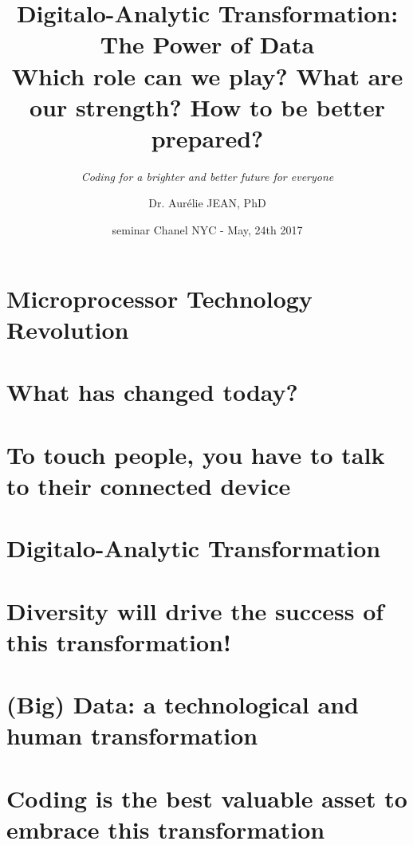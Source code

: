 \documentclass{beamer}
\title{Digitalo-Analytic Transformation:\\The Power of Data \\Which role can we play? What are our strength? How to be better prepared?}
\subtitle{\textcolor{isvblue}{\textit{Coding for a brighter and better future for everyone}}}
\author{Dr. Aur\'elie JEAN, PhD}
\institute{\textcolor{isvblue}{In Silico Veritas, LLC} - aurelie@silicoveritas.com}
\date{seminar Chanel NYC - May, 24th 2017}
\begin{document}
	\setcounter{showProgressBar}{0}
	\setcounter{showSlideNumbers}{0}

        \begin{frame}%
        \maketitle
        \end{frame}


	\setcounter{framenumber}{0}
	\setcounter{showProgressBar}{1}
	\setcounter{showSlideNumbers}{1}

        
        \section{Microprocessor Technology Revolution}
        

        \section{What has changed today?}
        

        \section{To touch people, you have to talk to their connected device}


        \section{Digitalo-Analytic Transformation}
        
        
        \section{Diversity will drive the success of this transformation!}
        

        

	\section{(Big) Data: a technological and human transformation}
        

       \section{Coding is the best valuable asset to embrace this transformation}
        
\end{document}
